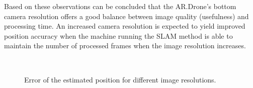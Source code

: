 Based on these observations can be concluded that the AR.Drone's bottom camera resolution offers a good balance between image quality (usefulness) and processing time.
An increased camera resolution is expected to yield improved position accuracy when the machine running the SLAM method is able to maintain the number of processed frames when the image resolution increases.




\begin{figure}[htb!]
  \begin{center}
\\

 \end{center}
  \caption{Error of the estimated position for different image resolutions.}
  \label{fig:exp3-error}
\end{figure}



